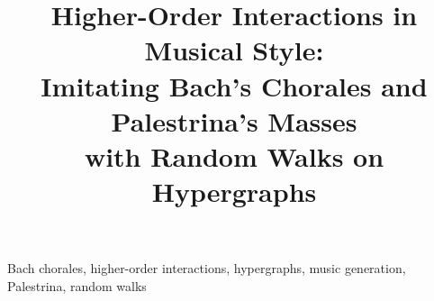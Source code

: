 \documentclass[conference]{IEEEtran}  %
\begin{document}
\title{Higher-Order Interactions in Musical Style:\\ Imitating Bach's Chorales and Palestrina's Masses\\ with Random Walks on Hypergraphs}
\author{
}
\maketitle

\begin{abstract}

\end{abstract}

\begin{IEEEkeywords}
Bach chorales, higher-order interactions, hypergraphs, music generation, Palestrina, random walks
\end{IEEEkeywords}








\end{document}
